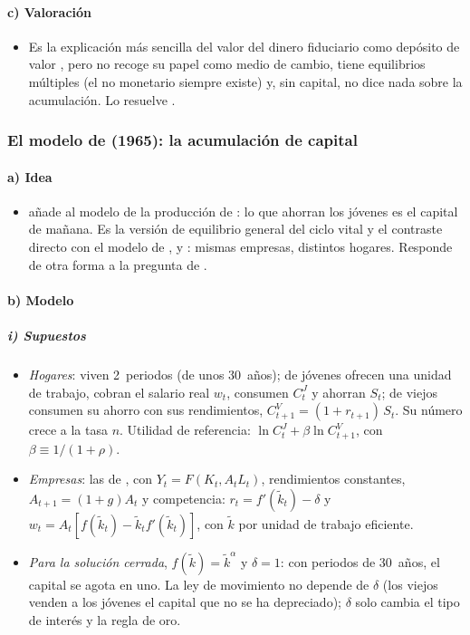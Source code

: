 \documentclass[11pt]{article}
\begin{document}
\paragraph{c) Valoración}

\begin{itemize}
\item Es la explicación más sencilla del valor del dinero fiduciario como depósito de valor  , pero no recoge su papel como medio de cambio, tiene equilibrios múltiples (el no monetario siempre existe) y, sin capital, no dice nada sobre la acumulación. Lo resuelve .
\end{itemize}

\subsubsection{El modelo de  (1965): la acumulación de capital}\label{sec:diamond}

\paragraph{a) Idea}

\begin{itemize}
\item \textcite{Diamond1965National} añade al modelo de  la producción de : lo que ahorran los jóvenes es el capital de mañana. Es la versión de equilibrio general del ciclo vital  y el contraste directo con el modelo de ,  y : mismas empresas, distintos hogares. Responde de otra forma a la pregunta de .
\end{itemize}

\paragraph{b) Modelo}

\subparagraph{i) Supuestos}

\begin{itemize}
\item \emph{Hogares}: viven 2~periodos (de unos 30~años); de jóvenes ofrecen una unidad de trabajo, cobran el salario real $w_t$, consumen $C^J_t$ y ahorran $S_t$; de viejos consumen su ahorro con sus rendimientos, $C^V_{t+1}=(1+r_{t+1})\,S_t$. Su número crece a la tasa $n$. Utilidad de referencia: $\ln C^J_t+\beta\ln C^V_{t+1}$, con $\beta\equiv1/(1+\rho)$.
\item \emph{Empresas}: las de  , con $Y_t=F(K_t,A_tL_t)$, rendimientos constantes, $A_{t+1}=(1+g)A_t$ y competencia: $r_t=f'(\tilde k_t)-\delta$ y $w_t=A_t\left[f(\tilde k_t)-\tilde k_tf'(\tilde k_t)\right]$, con $\tilde k$ por unidad de trabajo eficiente.
\item \emph{Para la solución cerrada}, $f(\tilde k)=\tilde k^{\alpha}$ y $\delta=1$: con periodos de 30~años, el capital se agota en uno. La ley de movimiento no depende de $\delta$ (los viejos venden a los jóvenes el capital que no se ha depreciado); $\delta$ solo cambia el tipo de interés y la regla de oro.
\end{itemize}
\end{document}
